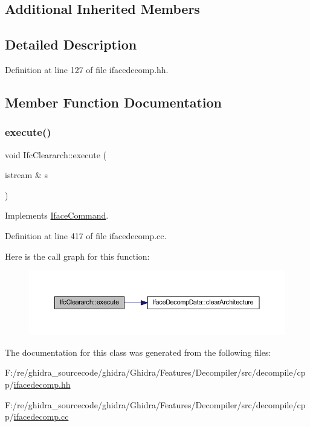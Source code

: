 \subsection*{Additional Inherited Members}


\subsection{Detailed Description}


Definition at line 127 of file ifacedecomp.\+hh.



\subsection{Member Function Documentation}
\mbox{\label{class_ifc_cleararch_a3a74e8bd153fd7da6139b41d4bf7c90d}} 
\subsubsection{\texorpdfstring{execute()}{execute()}}
{\footnotesize\ttfamily void Ifc\+Cleararch\+::execute (\begin{DoxyParamCaption}\item[{istream \&}]{s }\end{DoxyParamCaption})\hspace{0.3cm}{\ttfamily [virtual]}}



Implements \mbox{\hyperlink{class_iface_command_af10e29cee2c8e419de6efe9e680ad201}{Iface\+Command}}.



Definition at line 417 of file ifacedecomp.\+cc.

Here is the call graph for this function\+:
\nopagebreak
\begin{figure}[H]
\begin{center}
\leavevmode
\includegraphics[width=350pt]{class_ifc_cleararch_a3a74e8bd153fd7da6139b41d4bf7c90d_cgraph}
\end{center}
\end{figure}


The documentation for this class was generated from the following files\+:\begin{DoxyCompactItemize}
\item 
F\+:/re/ghidra\+\_\+sourcecode/ghidra/\+Ghidra/\+Features/\+Decompiler/src/decompile/cpp/\mbox{\hyperlink{ifacedecomp_8hh}{ifacedecomp.\+hh}}\item 
F\+:/re/ghidra\+\_\+sourcecode/ghidra/\+Ghidra/\+Features/\+Decompiler/src/decompile/cpp/\mbox{\hyperlink{ifacedecomp_8cc}{ifacedecomp.\+cc}}\end{DoxyCompactItemize}
